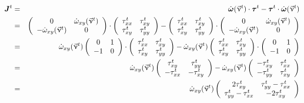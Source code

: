 \begin{eqnarray}
{\bm J}^t 
&=& \dot{\bm \omega}(\vec\upnu^t) \cdot {\bm \tau}^t - {\bm \tau}^t \cdot \dot{\bm \omega}(\vec\upnu^t)  \nonumber\\
&=&
\left( \begin{array}{cc}
0 & \dot{\omega}_{xy}(\vec\upnu^t) \\
-\dot{\omega}_{xy}(\vec\upnu^t) & 0
\end{array}\right)
\cdot
\left( \begin{array}{cc}
\tau^t_{xx} & \tau^t_{xy} \\
\tau^t_{xy} & \tau^t_{yy}
\end{array}\right)
-
\left( \begin{array}{cc}
\tau^t_{xx} & \tau^t_{xy} \\
\tau^t_{xy} & \tau^t_{yy}
\end{array}\right)
\cdot
\left( \begin{array}{cc}
0 & \dot{\omega}_{xy}(\vec\upnu^t) \\
-\dot{\omega}_{xy}(\vec\upnu^t) & 0
\end{array}\right)\nonumber\\
&=&
\dot{\omega}_{xy}(\vec\upnu^t)
\left( \begin{array}{cc}
0 & 1\\ 
-1 & 0
\end{array}\right)
\cdot
\left( \begin{array}{cc}
\tau^t_{xx} & \tau^t_{xy} \\
\tau^t_{xy} & \tau^t_{yy}
\end{array}\right)
-
\dot{\omega}_{xy}(\vec\upnu^t)
\left( \begin{array}{cc}
\tau^t_{xx} & \tau^t_{xy} \\
\tau^t_{xy} & \tau^t_{yy}
\end{array}\right)
\cdot
\left( \begin{array}{cc}
0 & 1 \\ 
-1 & 0
\end{array}\right) \nonumber\\
&=&
\dot{\omega}_{xy}(\vec\upnu^t)
\left( \begin{array}{cc}
\tau^t_{xy} & \tau^t_{yy} \\
-\tau^t_{xx} & -\tau^t_{xy}
\end{array}\right)
-
\dot{\omega}_{xy}(\vec\upnu^t)
\left( \begin{array}{cc}
-\tau^t_{xy} & \tau^t_{xx} \\
-\tau^t_{yy} & \tau^t_{xy}
\end{array}\right) \nonumber\\
&=&
\dot{\omega}_{xy}(\vec\upnu^t)
\left( \begin{array}{cc}
2\tau^t_{xy} & \tau_{yy}^t-\tau_{xx}^t \\
\tau^t_{yy}-\tau_{xx}^t & -2\tau_{xy}^t
\end{array}\right)
\end{eqnarray}

